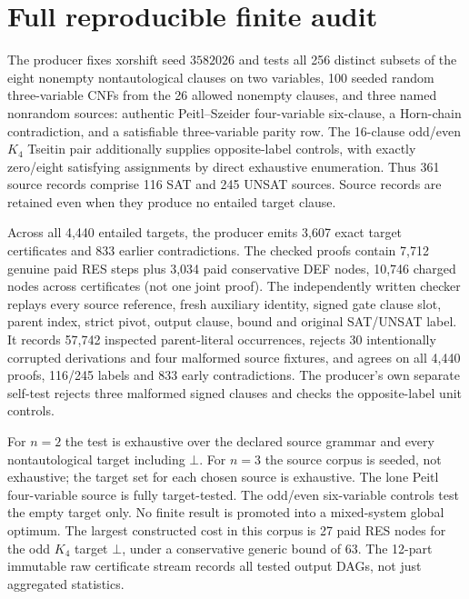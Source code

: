 \documentclass[11pt]{article}
\begin{document}
\section*{Full reproducible finite audit}
The producer fixes xorshift seed $3582026$ and tests all 256 distinct subsets of the eight nonempty nontautological clauses on two variables, 100 seeded random three-variable CNFs from the 26 allowed nonempty clauses, and three named nonrandom sources: authentic Peitl--Szeider four-variable six-clause, a Horn-chain contradiction, and a satisfiable three-variable parity row. The 16-clause odd/even $K_4$ Tseitin pair additionally supplies opposite-label controls, with exactly zero/eight satisfying assignments by direct exhaustive enumeration. Thus 361 source records comprise 116 SAT and 245 UNSAT sources. Source records are retained even when they produce no entailed target clause.

Across all 4,440 entailed targets, the producer emits 3,607 exact target certificates and 833 earlier contradictions. The checked proofs contain 7,712 genuine paid RES steps plus 3,034 paid conservative DEF nodes, 10,746 charged nodes across certificates (not one joint proof). The independently written checker replays every source reference, fresh auxiliary identity, signed gate clause slot, parent index, strict pivot, output clause, bound and original SAT/UNSAT label. It records 57,742 inspected parent-literal occurrences, rejects 30 intentionally corrupted derivations and four malformed source fixtures, and agrees on all 4,440 proofs, 116/245 labels and 833 early contradictions. The producer's own separate self-test rejects three malformed signed clauses and checks the opposite-label unit controls.

For $n=2$ the test is exhaustive over the declared source grammar and every nontautological target including $\bot$. For $n=3$ the source corpus is seeded, not exhaustive; the target set for each chosen source is exhaustive. The lone Peitl four-variable source is fully target-tested. The odd/even six-variable controls test the empty target only. No finite result is promoted into a mixed-system global optimum. The largest constructed cost in this corpus is 27 paid RES nodes for the odd $K_4$ target $\bot$, under a conservative generic bound of 63. The 12-part immutable raw certificate stream records all tested output DAGs, not just aggregated statistics.
\end{document}
